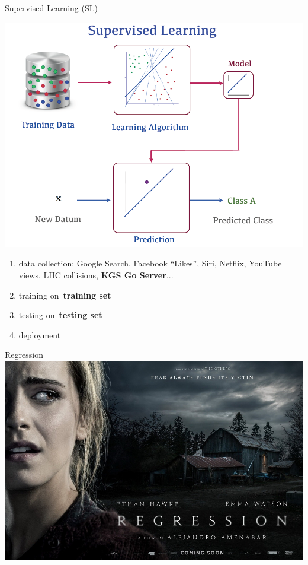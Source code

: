 \documentclass{beamer}
\begin{document}
  {
    \begin{frame}{Supervised Learning (SL)}
      \begin{center}
        \includegraphics[height=.6\textheight]{../img/SL_workflow.png}
      \end{center}
      \pause

      \begin{enumerate}[<+- | alert@+>]
          \tiny
        \item data collection: Google Search, Facebook ``Likes'', Siri, Netflix, YouTube views, LHC collisions, \textbf{KGS Go Server}...
        \item training on~\textbf{training set}
        \item testing on~\textbf{testing set}
        \item deployment
      \end{enumerate}
      \pause
    \end{frame}
  }

  \begin{frame}[standout]{Regression}
    \pause
    \includegraphics[width=\textwidth]{../img/regression_movie.jpg}
  \end{frame}
\end{document}
